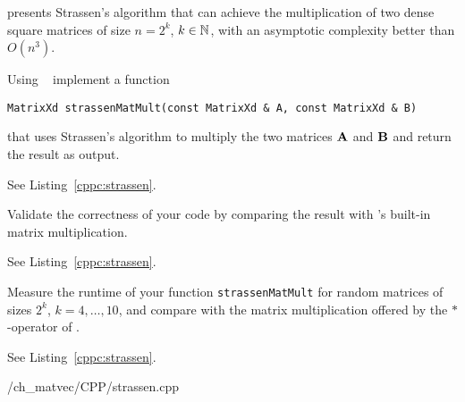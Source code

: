 \renewcommand{\chpt}{ch_matvec}

\begin{problem}
  \label{prb:fastmatmult}
   presents Strassen's algorithm that can achieve
  the multiplication of two dense square matrices of size {$n=2^{k}$},
  $k\in\mathbb{N}$, with an asymptotic complexity better than $O(n^{3})$.

  \begin{subproblem}[2]
    \label{sp:strassen:1}
    Using \eigen~ implement a function
\begin{lstlisting}[style=cppsimple]
 MatrixXd strassenMatMult(const MatrixXd & A, const MatrixXd & B)
\end{lstlisting}
    that uses Strassen's algorithm to multiply the two matrices ${\mathbf{A}}$ and
    ${\mathbf{B}}$ and return the result as output. 

    \begin{solution}
      See Listing~\ref{cppc:strassen}.   
    \end{solution}

  \end{subproblem}

  \begin{subproblem}[2]
    Validate the correctness of your code by comparing the result
    with \eigen's built-in matrix multiplication.

    \begin{solution}
     See Listing~\ref{cppc:strassen}.     
    \end{solution}
  \end{subproblem}

  \begin{subproblem}[3]
     \label{sp:strassen:2}
    Measure the runtime of your function
    \lstinline[style=cppsimple]|strassenMatMult|
    for random matrices of sizes $2^{k}$, $k=4,\ldots,10$, and compare
    with the matrix multiplication offered by the $\ast$-operator
    of \eigen{}.

    \begin{solution}
     See Listing~\ref{cppc:strassen}.
     
{\problems/\chpt/CPP/strassen.cpp}
    \end{solution}
    
    


  \end{subproblem}
\end{problem}
